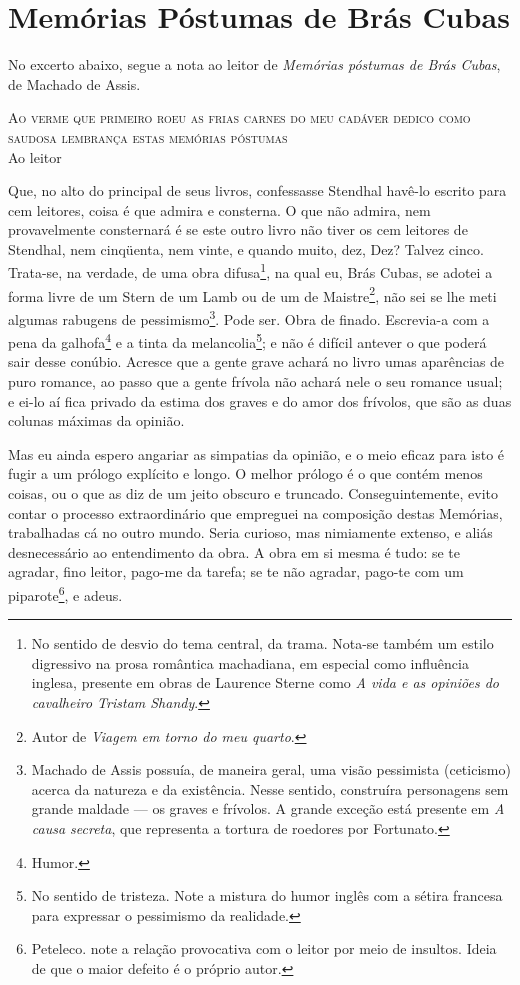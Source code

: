 
\chapter{Memórias Póstumas de Brás Cubas}

No excerto abaixo, segue a nota ao leitor de \textit{Memórias póstumas de Brás Cubas}, de Machado de Assis.

\begin{corollary}
\textsc{Ao verme que primeiro roeu as frias carnes do meu cadáver dedico como saudosa lembrança estas memórias póstumas} \\

Ao leitor %

Que, no alto do principal de seus livros, confessasse Stendhal havê-lo escrito para cem leitores, coisa é que admira e consterna. O que não admira, nem provavelmente consternará é se este outro livro não tiver os cem leitores de Stendhal, nem cinqüenta, nem vinte, e quando muito, dez, Dez? Talvez cinco. Trata-se, na verdade, de uma obra difusa\footnote{No sentido de desvio do tema central, da trama. Nota-se também um estilo digressivo na prosa romântica machadiana, em especial como influência inglesa, presente em obras de Laurence Sterne como \textit{A vida e as opiniões do cavalheiro Tristam Shandy}.}, na qual eu, Brás Cubas, se adotei a forma livre de um Stern de um Lamb ou de um de Maistre\footnote{Autor de \textit{Viagem em torno do meu quarto}.}, não sei se lhe meti algumas rabugens de pessimismo\footnote{Machado de Assis possuía, de maneira geral, uma visão pessimista (ceticismo) acerca da natureza e da existência. Nesse sentido, construíra personagens sem grande maldade — os graves e frívolos. A grande exceção está presente em \textit{A causa secreta}, que representa a tortura de roedores por Fortunato.}. Pode ser. Obra de finado. Escrevia-a com a pena da galhofa\footnote{Humor.} e a tinta da melancolia\footnote{No sentido de tristeza. Note a mistura do humor inglês com a sétira francesa para expressar o pessimismo da realidade.}; e não é difícil antever o que poderá sair desse conúbio. Acresce que a gente grave achará no livro umas aparências de puro romance, ao passo que a gente frívola não achará nele o seu romance usual; e ei-lo aí fica privado da estima dos graves e do amor dos frívolos, que são as duas colunas máximas da opinião.

Mas eu ainda espero angariar as simpatias da opinião, e o meio eficaz para isto é fugir a um prólogo explícito e longo. O melhor prólogo é o que contém menos coisas, ou o que as diz de um jeito obscuro e truncado. Conseguintemente, evito contar o processo extraordinário que empreguei na composição destas Memórias, trabalhadas cá no outro mundo. Seria curioso, mas nimiamente extenso, e aliás desnecessário ao entendimento da obra. A obra em si mesma é tudo: se te agradar, fino leitor, pago-me da tarefa; se te não agradar, pago-te com um piparote\footnote{Peteleco. note a relação provocativa com o leitor por meio de insultos. Ideia de que o maior defeito é o próprio autor.}, e adeus.


\end{corollary}
